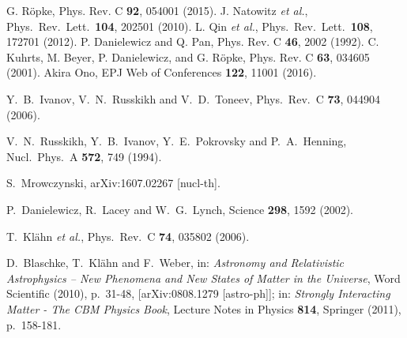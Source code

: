 \documentclass[epj]{svjour}
\begin{document}
\begin{thebibliography}{9}
G. R\"opke, Phys. Rev. C {\bf 92}, 054001 (2015).
J. Natowitz {\it et al.},  Phys.\ Rev.\ Lett.\ {\bf 104}, 202501 (2010).
L. Qin {\it et al.},  Phys.\ Rev.\ Lett.\ {\bf 108}, 172701 (2012).
P. Danielewicz and Q. Pan, Phys. Rev. C {\bf 46}, 2002 (1992).
C. Kuhrts, M. Beyer, P. Danielewicz, and G. R\"opke,
Phys. Rev. C {\bf 63}, 034605 (2001). 
Akira Ono, EPJ Web of Conferences {\bf 122}, 11001 (2016).

  Y.~B.~Ivanov, V.~N.~Russkikh and V.~D.~Toneev,
  Phys.\ Rev.\ C {\bf 73}, 044904 (2006).

  V.~N.~Russkikh, Y.~B.~Ivanov, Y.~E.~Pokrovsky and P.~A.~Henning,
  Nucl.\ Phys.\ A {\bf 572}, 749 (1994).

  S.~Mrowczynski,
  arXiv:1607.02267 [nucl-th].

  P.~Danielewicz, R.~Lacey and W.~G.~Lynch,
  Science {\bf 298}, 1592 (2002).

  T.~Kl\"ahn {\it et al.},
  Phys.\ Rev.\  C {\bf 74}, 035802 (2006).

  D.~Blaschke, T.~Kl\"ahn and F.~Weber,
  in: {\it Astronomy and Relativistic
  Astrophysics -- New Phenomena and New States of Matter in the
  Universe}, Word Scientific (2010), p.\ 31-48, [arXiv:0808.1279
  [astro-ph]];
  in: {\it Strongly Interacting Matter - The CBM Physics Book},
  Lecture Notes in Physics {\bf 814}, Springer (2011), p.\ 158-181.


\end{thebibliography}
\end{document}
